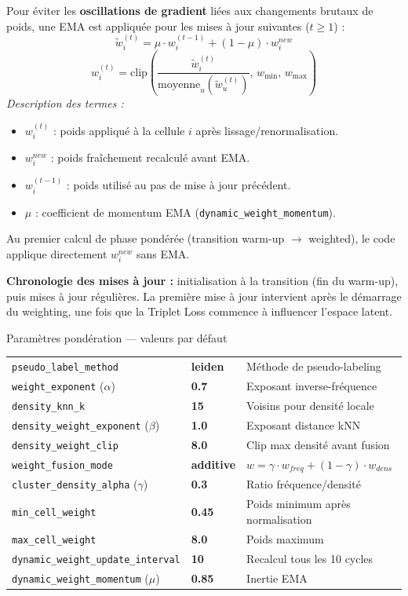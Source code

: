 \documentclass[11pt,a4paper]{article}
\begin{document}
Pour \'eviter les \textbf{oscillations de gradient} li\'ees aux changements brutaux de poids, une EMA est appliqu\'ee pour les mises \`a jour suivantes ($t\ge 1$) :
\[
  \tilde{w}_i^{(t)} = \mu \cdot w_i^{(t-1)} + (1-\mu) \cdot w_i^{new}
\]
\[
  w_i^{(t)} = \mathrm{clip}\!\left(\frac{\tilde{w}_i^{(t)}}{\mathrm{moyenne}_{u}(\tilde{w}_u^{(t)})},\,w_{\min},\,w_{\max}\right)
\]
\textit{Description des termes :}
\begin{itemize}[nosep]
  \item $w_i^{(t)}$ : poids appliqu\'e \`a la cellule $i$ apr\`es lissage/renormalisation.
  \item $w_i^{new}$ : poids fra\^ichement recalcul\'e avant EMA.
  \item $w_i^{(t-1)}$ : poids utilis\'e au pas de mise \`a jour pr\'ec\'edent.
  \item $\mu$ : coefficient de momentum EMA (\texttt{dynamic\_weight\_momentum}).
\end{itemize}
Au premier calcul de phase pond\'er\'ee (transition warm-up $\to$ weighted), le code applique directement $w_i^{new}$ sans EMA.

\textbf{Chronologie des mises \`a jour :} initialisation \`a la transition (fin du warm-up), puis mises \`a jour r\'eguli\`eres. La premi\`ere mise \`a jour intervient apr\`es le d\'emarrage du weighting, une fois que la Triplet Loss commence \`a influencer l'espace latent.

\begin{parambox}{Param\`etres pond\'eration --- valeurs par d\'efaut}
\begin{tabular}{lll}
\texttt{pseudo\_label\_method} & \textbf{leiden} & M\'ethode de pseudo-labeling \\
\texttt{weight\_exponent} ($\alpha$) & \textbf{0.7} & Exposant inverse-fr\'equence \\
\texttt{density\_knn\_k} & \textbf{15} & Voisins pour densit\'e locale \\
\texttt{density\_weight\_exponent} ($\beta$) & \textbf{1.0} & Exposant distance kNN \\
\texttt{density\_weight\_clip} & \textbf{8.0} & Clip max densit\'e avant fusion \\
\texttt{weight\_fusion\_mode} & \textbf{additive} & $w = \gamma \cdot w_{freq} + (1-\gamma) \cdot w_{dens}$ \\
\texttt{cluster\_density\_alpha} ($\gamma$) & \textbf{0.3} & Ratio fr\'equence/densit\'e \\
\texttt{min\_cell\_weight} & \textbf{0.45} & Poids minimum apr\`es normalisation \\
\texttt{max\_cell\_weight} & \textbf{8.0} & Poids maximum \\
\texttt{dynamic\_weight\_update\_interval} & \textbf{10} & Recalcul tous les 10 cycles \\
\texttt{dynamic\_weight\_momentum} ($\mu$) & \textbf{0.85} & Inertie EMA \\
\end{tabular}
\end{parambox}
\end{document}

